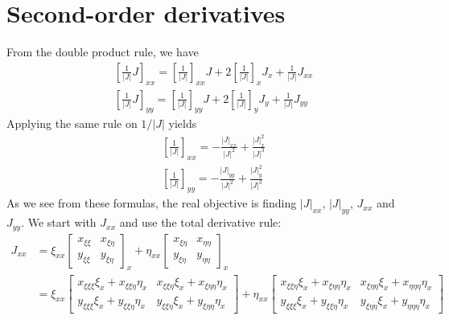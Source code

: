 \documentclass[final,1p,times]{elsarticle}
\begin{document}
\section{Second-order derivatives}\noindent
From the double product rule, we have 
\begin{subequations}
\begin{align}
&\left[\frac{1}{|J|}J\right]_{xx} = \left[\frac{1}{|J|}\right]_{xx}J+2\left[\frac{1}{|J|}\right]_x J_x+\frac{1}{|J|}J_{xx} \\
&\left[\frac{1}{|J|}J\right]_{yy} = \left[\frac{1}{|J|}\right]_{yy}J+2\left[\frac{1}{|J|}\right]_y J_y+\frac{1}{|J|}J_{yy}
\end{align}
\end{subequations}
Applying the same rule on $1/|J|$ yields
\begin{subequations}
\begin{align}
&\left[\frac{1}{|J|}\right]_{xx} = -\frac{|J|_{xx}}{|J|^2}+\frac{|J|_x^2}{|J|^3} \\
&\left[\frac{1}{|J|}\right]_{yy} = -\frac{|J|_{yy}}{|J|^2}+\frac{|J|_y^2}{|J|^3}
\end{align}
\end{subequations}
\clearpage\noindent
As we see from these formulas, the real objective is finding $|J|_{xx}$, $|J|_{yy}$, $J_{xx}$ and $J_{yy}$. We start with $J_{xx}$ and use the total derivative rule:
\begin{align*}
J_{xx}	&= \xi_{xx}\begin{bmatrix} x_{\xi\xi} & x_{\xi\eta} \\ y_{\xi\xi} & y_{\xi\eta} \end{bmatrix}_x + \eta_{xx}\begin{bmatrix} x_{\xi\eta} & x_{\eta\eta} \\ y_{\xi\eta} & y_{\eta\eta} \end{bmatrix}_x \\
		&= \xi_{xx}\begin{bmatrix} x_{\xi\xi\xi}\xi_x+x_{\xi\xi\eta}\eta_x & x_{\xi\xi\eta}\xi_x+x_{\xi\eta\eta}\eta_x \\ y_{\xi\xi\xi}\xi_x+y_{\xi\xi\eta}\eta_x & y_{\xi\xi\eta}\xi_x+y_{\xi\eta\eta}\eta_x \end{bmatrix} + \eta_{xx}\begin{bmatrix} x_{\xi\xi\eta}\xi_x+x_{\xi\eta\eta}\eta_x & x_{\xi\eta\eta}\xi_x+x_{\eta\eta\eta}\eta_x \\ y_{\xi\xi\xi}\xi_x+y_{\xi\xi\eta}\eta_x  & y_{\xi\eta\eta}\xi_x+y_{\eta\eta\eta}\eta_x \end{bmatrix}
\end{align*}
\end{document}
